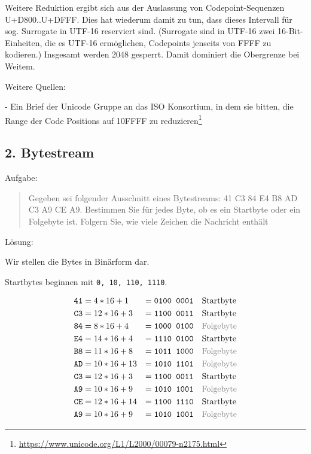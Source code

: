 \documentclass{article}
\begin{document}
Weitere Reduktion ergibt sich aus der Auslassung von Codepoint-Sequenzen U+D800..U+DFFF. Dies hat wiederum damit zu tun, dass dieses Intervall für sog. Surrogate in UTF-16 reserviert sind. (Surrogate sind in UTF-16 zwei 16-Bit-Einheiten, die es UTF-16 ermöglichen, Codepoints jenseits von FFFF zu kodieren.) Insgesamt werden 2048 gesperrt. Damit dominiert die Obergrenze bei Weitem.

Weitere Quellen:

- Ein Brief der Unicode Gruppe an das ISO Konsortium, in dem sie bitten, die Range der Code Positions auf 10FFFF zu reduzieren\footnote{\url{https://www.unicode.org/L1/L2000/00079-n2175.html}}  

\subsection*{2. Bytestream}

Aufgabe:
\begin{quote}
Gegeben sei folgender Ausschnitt eines Bytestreams: 41 C3 84 E4 B8 AD
C3 A9 CE A9. Bestimmen Sie für jedes Byte, ob es ein Startbyte oder ein
Folgebyte ist. Folgern Sie, wie viele Zeichen die Nachricht enthält
\end{quote}

\noindent Lösung:

Wir stellen die Bytes in Binärform dar.

Startbytes beginnen mit \texttt{0, 10, 110, 1110}.

\begin{align*}
\texttt{41} &= 4 * 16 + 1 &= \texttt{0100 0001} & \quad \text{Startbyte} \\
\texttt{C3} &= 12 * 16 + 3 &= \texttt{1100 0011} & \quad \text{Startbyte} \\
\texttt{84} &= 8 * 16 + 4 &= \texttt{1000 0100} & \quad \textcolor{gray}{\mathrm{Folgebyte}} \\
\texttt{E4} &= 14 * 16 + 4 &= \texttt{1110 0100} & \quad \text{Startbyte} \\
\texttt{B8} &= 11 * 16 + 8 &= \texttt{1011 1000} & \quad \textcolor{gray}{\mathrm{Folgebyte}} \\
\texttt{AD} &= 10 * 16 + 13 &= \texttt{1010 1101} & \quad \textcolor{gray}{\mathrm{Folgebyte}} \\
\texttt{C3} &= 12 * 16 + 3 &= \texttt{1100 0011} & \quad \text{Startbyte} \\
\texttt{A9} &= 10 * 16 + 9 &= \texttt{1010 1001} & \quad \textcolor{gray}{\mathrm{Folgebyte}} \\
\texttt{CE} &= 12 * 16 + 14 &= \texttt{1100 1110} & \quad \text{Startbyte} \\
\texttt{A9} &= 10 * 16 + 9 &= \texttt{1010 1001} & \quad \textcolor{gray}{\mathrm{Folgebyte}} \\
\end{align*}
\end{document}
